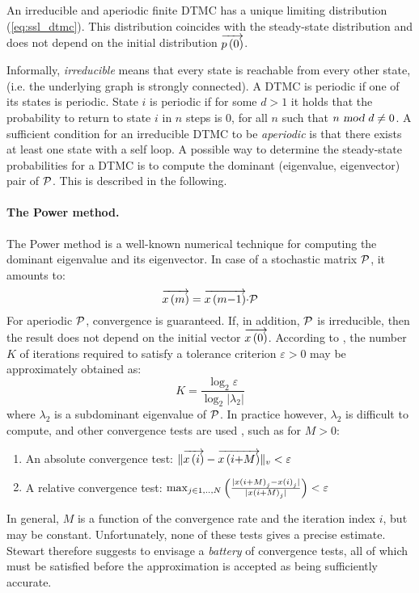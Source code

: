 \documentclass{entcs}
\begin{document}
		\begin{theorem}
			\cite{Haverkort_98} An irreducible and aperiodic finite DTMC has a unique limiting distribution (\ref{eq:ssl_dtmc}).  This distribution coincides with the steady-state distribution and does not depend on the initial distribution $\overrightarrow{p \left( 0 \right)}$.
		\end{theorem}
		
		Informally, \emph{irreducible} means that every state is reachable from every other state, (i.e. the underlying graph is strongly connected).  A DTMC is periodic if one of its states is periodic.  State $i$ is periodic if for some $d > 1$ it holds that the probability to return to state $i$ in $n$ steps is 0, for all $n$ such that $n \mbox{ \sl mod } d \neq 0$.  A sufficient condition for an irreducible DTMC to be \emph{aperiodic} is that there exists at least one state with a self loop. A possible way to determine the steady-state probabilities for a DTMC is to compute the dominant (eigenvalue, eigenvector) pair of $\mathcal{P}$.  This is described in the following.
		
		\paragraph{The Power method. \label{sss:power_method}}
		The Power method \cite{Stewart_94} is a well-known numerical technique for computing the dominant eigenvalue and its eigenvector.
		In case of a stochastic matrix $\mathcal{P}$, it amounts to:
		\begin{equation}
			\overrightarrow{x\left(m\right)} = \overrightarrow{x\left(m{-}1\right)}{\cdot}\mathcal{P} \nonumber
		\end{equation}
		For aperiodic $\mathcal{P}$, convergence is guaranteed.  If, in addition, $\mathcal{P}$ is irreducible, then the result does not depend on the initial vector $\overrightarrow{x\left(0\right)}$.
		According to \cite{Stewart_94}, the number $K$ of iterations required to satisfy a tolerance criterion $\varepsilon > 0$ may be approximately obtained as:
		\begin{equation}
			K = \dfrac{\log_{2} \varepsilon}{\log_{2} | \lambda_{2} |} \nonumber
		\end{equation}
		where $\lambda_{2}$ is a subdominant eigenvalue of $\mathcal{P}$.
		In practice however, $ \lambda_{2}$ is difficult to compute, and other convergence tests are used \cite{Stewart_94}, such as for $M > 0$:
		\begin{enumerate}
			\item An absolute convergence test: $\lVert \overrightarrow{x\left(i\right)} - \overrightarrow{x\left(i{+}M\right)} \rVert_{v} < \varepsilon$
			\item A relative convergence test: $\max_{j \in 1,..,N} \left( \frac{ | x\left(i{+}M\right)_{j} - x\left(i\right)_{j} |}{ | x\left(i{+}M\right)_{j} |} \right) < \varepsilon$
		\end{enumerate}
		In general, $M$ is a function of the convergence rate and the iteration index $i$, but may be  constant.
		Unfortunately, none of these tests gives a precise estimate.  Stewart \cite{Stewart_94} therefore suggests to envisage a \emph{battery} of convergence tests, all of which must be satisfied before the approximation is accepted as being sufficiently accurate.
\end{document}
